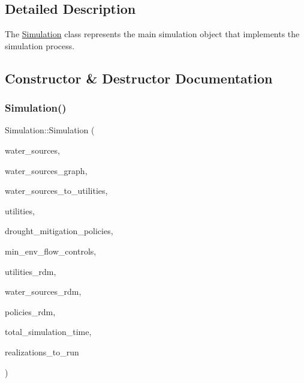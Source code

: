 \subsection{Detailed Description}
The {\ttfamily \mbox{\hyperlink{classSimulation}{Simulation}}} class represents the main simulation object that implements the simulation process. 

\subsection{Constructor \& Destructor Documentation}
\mbox{\label{classSimulation_ac9b9db9c3de5f9ff33f6ea89e2435c87}} 
\subsubsection{\texorpdfstring{Simulation()}{Simulation()}\hspace{0.1cm}{\footnotesize\ttfamily [1/4]}}
{\footnotesize\ttfamily Simulation\+::\+Simulation (\begin{DoxyParamCaption}\item[{vector$<$ \mbox{\hyperlink{classWaterSource}{Water\+Source}} $\ast$$>$ \&}]{water\+\_\+sources,  }\item[{\mbox{\hyperlink{classGraph}{Graph}} \&}]{water\+\_\+sources\+\_\+graph,  }\item[{const vector$<$ vector$<$ int $>$$>$ \&}]{water\+\_\+sources\+\_\+to\+\_\+utilities,  }\item[{vector$<$ \mbox{\hyperlink{classUtility}{Utility}} $\ast$$>$ \&}]{utilities,  }\item[{const vector$<$ \mbox{\hyperlink{classDroughtMitigationPolicy}{Drought\+Mitigation\+Policy}} $\ast$$>$ \&}]{drought\+\_\+mitigation\+\_\+policies,  }\item[{vector$<$ \mbox{\hyperlink{classMinEnvFlowControl}{Min\+Env\+Flow\+Control}} $\ast$$>$ \&}]{min\+\_\+env\+\_\+flow\+\_\+controls,  }\item[{vector$<$ vector$<$ double $>$$>$ \&}]{utilities\+\_\+rdm,  }\item[{vector$<$ vector$<$ double $>$$>$ \&}]{water\+\_\+sources\+\_\+rdm,  }\item[{vector$<$ vector$<$ double $>$$>$ \&}]{policies\+\_\+rdm,  }\item[{const unsigned long}]{total\+\_\+simulation\+\_\+time,  }\item[{vector$<$ unsigned long $>$ \&}]{realizations\+\_\+to\+\_\+run }\end{DoxyParamCaption})}



